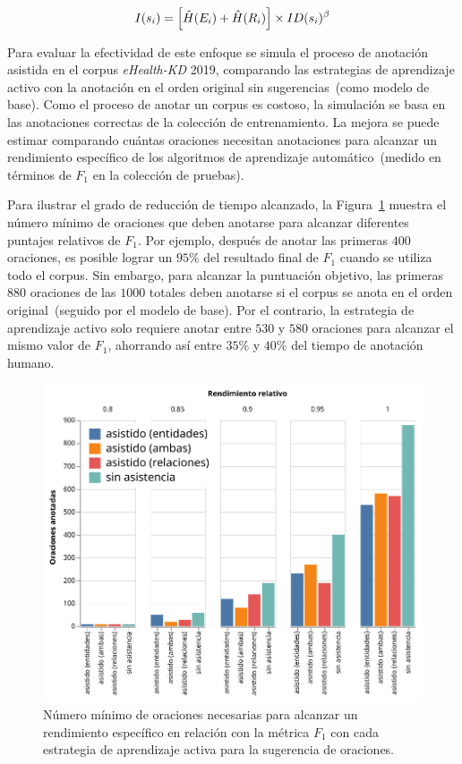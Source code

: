 \small
$$
    I(s_i) = \left[ \hat{H}(E_i) + \hat{H}(R_i) \right] \times ID(s_i)^{\beta}
$$
\normalsize

Para evaluar la efectividad de este enfoque se simula el proceso de anotación asistida en el corpus \textit{eHealth-KD} 2019, comparando las estrategias de aprendizaje activo con la anotación en el orden original sin sugerencias~(como modelo de base).
Como el proceso de anotar un corpus es costoso, la simulación se basa en las anotaciones correctas de la colección de entrenamiento.
La mejora se puede estimar comparando cuántas oraciones necesitan anotaciones para alcanzar un rendimiento específico de los algoritmos de aprendizaje automático~(medido en términos de $F_1$ en la colección de pruebas).

Para ilustrar el grado de reducción de tiempo alcanzado, la Figura~\ref{fig:graph2} muestra el número mínimo de oraciones que deben anotarse para alcanzar diferentes puntajes relativos de $F_1$.
Por ejemplo, después de anotar las primeras $400$ oraciones, es posible lograr un $95\%$ del resultado final de $F_1$ cuando se utiliza todo el corpus.
Sin embargo, para alcanzar la puntuación objetivo, las primeras $880$ oraciones de las $1000$ totales deben anotarse si el corpus se anota en el orden original~(seguido por el modelo de base).
Por el contrario, la estrategia de aprendizaje activo solo requiere anotar entre $530$ y $580$ oraciones para alcanzar el mismo valor de $F_1$, ahorrando así entre $35\%$ y $40\% $ del tiempo de anotación humano.

\begin{figure}[tb]
    \centering
    \includegraphics[width=0.8\columnwidth]{Images/Chapters/CostReductionAssistedAnnotation.pdf}
    \caption[Evaluación de la estrategia de aprendizaje activo]{Número mínimo de oraciones necesarias para alcanzar un rendimiento específico en relación con la métrica $F_1$ con cada estrategia de aprendizaje activa para la sugerencia de oraciones.}
    \label{fig:graph2}
\end{figure}


